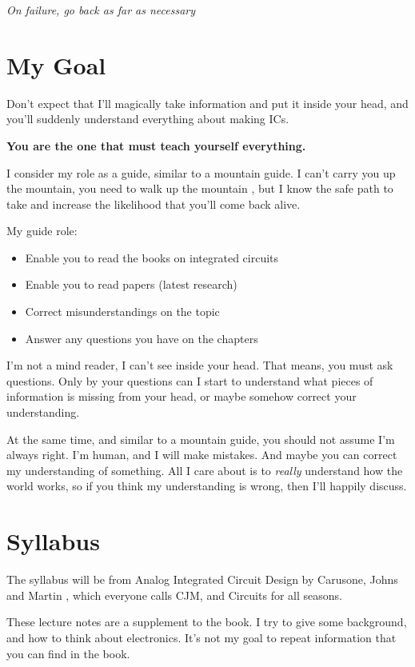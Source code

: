 \emph{On failure, go back as far as necessary}

\section{My Goal}\label{my-goal}

Don't expect that I'll magically take information and put it inside your
head, and you'll suddenly understand everything about making ICs.

\textbf{You are the one that must teach yourself everything.}

I consider my role as a guide, similar to a mountain guide. I can't
carry you up the mountain, you need to walk up the mountain , but I know
the safe path to take and increase the likelihood that you'll come back
alive.

My guide role:

\begin{itemize}
\tightlist
\item
  Enable you to read the books on integrated circuits
\item
  Enable you to read papers (latest research)
\item
  Correct misunderstandings on the topic
\item
  Answer any questions you have on the chapters
\end{itemize}

I'm not a mind reader, I can't see inside your head. That means, you
must ask questions. Only by your questions can I start to understand
what pieces of information is missing from your head, or maybe somehow
correct your understanding.

At the same time, and similar to a mountain guide, you should not assume
I'm always right. I'm human, and I will make mistakes. And maybe you can
correct my understanding of something. All I care about is to
\emph{really} understand how the world works, so if you think my
understanding is wrong, then I'll happily discuss.

\section{Syllabus}\label{syllabus}

The syllabus will be from Analog Integrated Circuit Design by Carusone,
Johns and Martin , which everyone calls
CJM, and Circuits for all seasons.

These lecture notes are a supplement to the book. I try to give some
background, and how to think about electronics. It's not my goal to
repeat information that you can find in the book.

